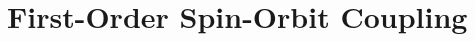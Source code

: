 \documentclass[12pt,a4paper]{report}
\numberwithin{equation}{section}
\begin{document}
\section{First-Order Spin-Orbit Coupling}
\end{document}
